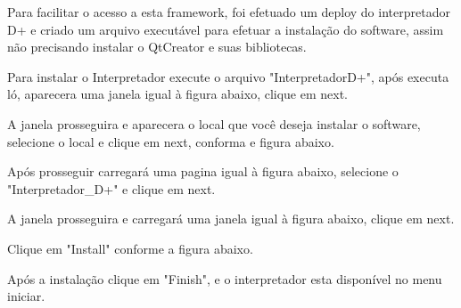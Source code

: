 \documentclass[12pt,oneside,a4paper,chapter=TITLE,section=TITLE,sumario=tradicional]{abntex2}
\begin{document}
\begin{figure}[htb]
\end{figure}


Para facilitar o acesso a esta framework, foi efetuado um deploy do interpretador D+ e criado um arquivo executável para efetuar a instalação do software, assim não precisando instalar o QtCreator e suas bibliotecas.

Para instalar o Interpretador execute o arquivo "InterpretadorD+", após executa ló, aparecera uma janela igual à figura abaixo, clique em next.

\begin{figure}[!htb]
\end{figure}

A janela prosseguira e aparecera o local que você deseja instalar o software, selecione o local e clique em next, conforma e figura abaixo.

\begin{figure}[H]
\end{figure}

Após prosseguir carregará uma pagina igual à figura abaixo, selecione o "Interpretador\_D+" e clique em next.

\begin{figure}[H]
\end{figure}

A janela prosseguira e carregará uma janela igual à figura abaixo, clique em next.

\begin{figure}[H]
\end{figure}

Clique em "Install" conforme a figura abaixo.

\begin{figure}[H]
\end{figure}

Após a instalação clique em "Finish", e o interpretador esta disponível no menu iniciar.

\begin{figure}[H]
\end{figure}
\end{document}
